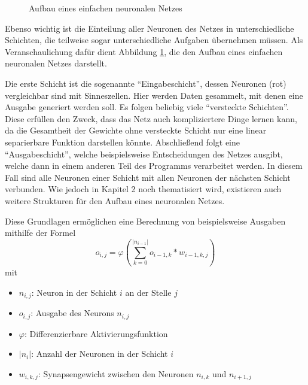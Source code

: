 \documentclass[12pt,a4]{article}
\begin{document}
\begin{figure}[!h]
\caption{Aufbau eines einfachen neuronalen Netzes}
\label{fig:Netzaufbau}
\end{figure}

Ebenso wichtig ist die Einteilung aller Neuronen des Netzes in unterschiedliche Schichten, die teilweise sogar unterschiedliche Aufgaben übernehmen müssen. Als Veranschaulichung dafür dient Abbildung \ref{fig:Netzaufbau}, die den Aufbau eines einfachen neuronalen Netzes darstellt. 

Die erste Schicht ist die sogenannte \enquote{Eingabeschicht}, dessen Neuronen (rot) vergleichbar sind mit Sinneszellen. Hier werden Daten gesammelt, mit denen eine Ausgabe generiert werden soll. Es folgen beliebig viele \enquote{versteckte Schichten}. Diese erfüllen den Zweck, dass das Netz auch kompliziertere Dinge lernen kann, da die Gesamtheit der Gewichte ohne versteckte Schicht nur eine linear separierbare Funktion darstellen könnte. Abschließend folgt eine \enquote{Ausgabeschicht}, welche beispielsweise Entscheidungen des Netzes ausgibt, welche dann in einem anderen Teil des Programms verarbeitet werden. In diesem Fall sind alle Neuronen einer Schicht mit allen Neuronen der nächsten Schicht verbunden. Wie jedoch in Kapitel 2 noch thematisiert wird, existieren auch weitere Strukturen für den Aufbau eines neuronalen Netzes.

Diese Grundlagen ermöglichen eine Berechnung von beispielsweise Ausgaben mithilfe der Formel
\begin{equation}
o_{i, j} = \varphi \left( \sum\limits_{k=0}^{|n_{i-1}|} o_{i-1, k} * w_{i - 1, k, j} \right)
\end{equation}
mit
\begin{itemize}
\item $n_{i, j}$: Neuron in der Schicht $i$ an der Stelle $j$
\item $o_{i, j}$: Ausgabe des Neurons $n_{i, j}$
\item $\varphi$: Differenzierbare Aktivierungsfunktion
\item $|n_i|$: Anzahl der Neuronen in der Schicht $i$
\item $w_{i, k, j}$: Synapsengewicht zwischen den Neuronen $n_{i, k}$ und $n_{i+1, j}$
\end{itemize}
\end{document}
